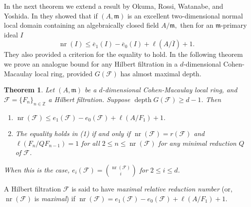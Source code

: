 \documentclass[12pt]{amsart}
\newtheorem{thm}{Theorem}[section]
\theoremstyle{definition}
\theoremstyle{remark}
\numberwithin{equation}{section}
\newcommand{\ov}{\overline}
\newcommand{\m}{{\mathfrak m}}
\DeclareMathOperator{\depth}{depth}
\DeclareMathOperator{\nr}{{nr}}
\newcommand{\FF}{\mathcal{F}}
\begin{document}
\par 
In the next theorem we extend a result by Okuma, Rossi, Watanabe, and Yoshida. In \cite[Theorem 2.7]{ORWY2022} they showed that if $(A,\m)$ is an excellent two-dimensional normal local domain containing an algebraically closed field $A/\m,$ then for an $\m$-primary ideal $I$
\[
\nr(I) \leq {\ov{e}_1}(I)-\ov{e}_0(I)+\ell(A/\ov{I})+1.
\]
They also provided a criterion for the equality to hold. 
In the following theorem we prove an analogue bound for 
any Hilbert filtration in a $d$-dimensional Cohen-Macaulay 
local ring, provided $G(\FF)$ has almost maximal depth.


\begin{thm} \label{thm:nr(F)=r(F)}
Let $(A, \m)$ be a $d$-dimensional Cohen-Macaulay local ring, 
and $\mathcal{F}=\{F_n\}_{n\in \mathbb{Z}}$ a Hilbert filtration. 
Suppose $\depth{G(\mathcal{F})}\geq d-1$. Then  
\begin{enumerate}
\item[\rm{(a)}]
$\nr(\mathcal{F})\leq {e_1}(\mathcal{F})-e_0(\mathcal{F})+\ell(A/F_1)+1$.
\item[\rm{(b)}] The equality holds in (1) 
if and only if $\nr(\FF) = r(\FF)$ and 
$\ell(F_n/QF_{n-1}) = 1$ 
for all $2 \leq n \leq \nr(\FF)$ for any minimal reduction $Q$ of 
$\FF$. 
\end{enumerate}
When this is the case, $e_i(\FF) = \binom{\nr(\FF)}{ i}$ for $2 \leq i \leq d$.
\end{thm}

\par 
A Hilbert filtration $\FF$ is said to have {\it maximal relative reduction number} (or, $\nr(\FF)$ is {\it maximal}) if $\nr(\FF)=e_1(\FF)-e_0(\FF)
+\ell(A/F_1)+1$. 
\end{document}
